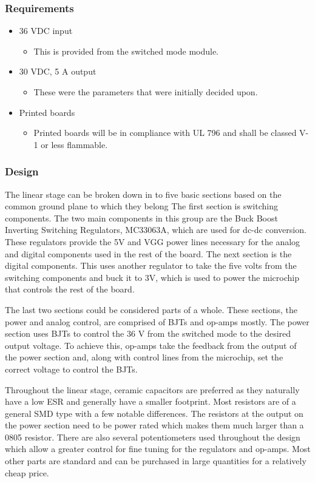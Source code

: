 \documentclass[15pt]{article}
\begin{document}
\subsubsection{Requirements}
\begin{itemize}
\item 36 VDC input \begin{itemize}
    \item This is provided from the switched mode module.
\end{itemize}
\item 30 VDC, 5 A output \begin{itemize}
    \item These were the parameters that were initially decided upon.
\end{itemize}
\item Printed boards \begin{itemize}
    \item Printed boards will be in compliance with UL 796 and shall be classed V-1 or less flammable.
\end{itemize}
\end{itemize}

\subsubsection{Design}


The linear stage can be broken down in to five basic sections based on the common ground plane to which they belong The first section is switching components. The two main components in this group are the Buck Boost Inverting Switching Regulators, MC33063A, which are used for dc-dc conversion. These regulators provide the 5V and VGG power lines necessary for the analog and digital components used in the rest of the board. The next section is the digital components. This uses another regulator to take the five volts from the switching components and buck it to 3V, which is used to power the microchip that controls the rest of the board.

The last two sections could be considered parts of a whole. These sections, the power and analog control, are comprised of BJTs and op-amps mostly. The power section uses BJTs to control the 36 V from the switched mode to the desired output voltage. To achieve this, op-amps take the feedback from the output of the power section and, along with control lines from the microchip, set the correct voltage to control the BJTs.

Throughout the linear stage, ceramic capacitors are preferred as they naturally have a low ESR and generally have a smaller footprint. Most resistors are of a general SMD type with a few notable differences. The resistors at the output on the power section need to be power rated which makes them much larger than a 0805 resistor. There are also several potentiometers used throughout the design which allow a greater control for fine tuning for the regulators and op-amps. Most other parts are standard and can be purchased in large quantities for a relatively cheap price.
\end{document}
